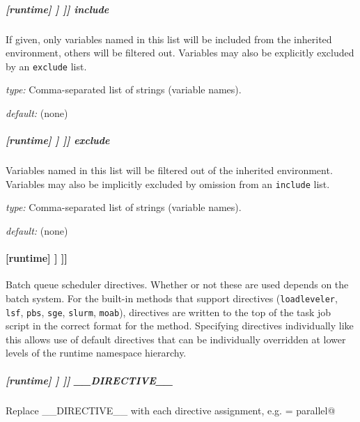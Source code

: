 \subparagraph[include]{[runtime] \textrightarrow [[\_\_NAME\_\_]] \textrightarrow [[[environment filter]]] \textrightarrow include}

If given, only variables named in this list will be included from the
inherited environment, others will be filtered out. Variables may also
be explicitly excluded by an \lstinline=exclude= list.

\begin{myitemize}
\item {\em type:} Comma-separated list of strings (variable names).
\item {\em default:} (none)
\end{myitemize}

\subparagraph[exclude]{[runtime] \textrightarrow [[\_\_NAME\_\_]] \textrightarrow [[[environment filter]]] \textrightarrow exclude}

Variables named in this list will be filtered out of the inherited
environment.  Variables may also be implicitly excluded by
omission from an \lstinline=include= list.

\begin{myitemize}
\item {\em type:} Comma-separated list of strings (variable names).
\item {\em default:} (none)
\end{myitemize}

\paragraph[{[[[}directives{]]]}]{[runtime] \textrightarrow [[\_\_NAME\_\_]] \textrightarrow [[[directives]]]}

Batch queue scheduler directives.  Whether or not these are used depends
on the batch system. For the built-in methods that support directives
(\lstinline=loadleveler=, \lstinline=lsf=, \lstinline=pbs=, \lstinline=sge=,
\lstinline=slurm=, \lstinline=moab=), directives are written to the top of the
task job script in the correct format for the method. Specifying directives
individually like this allows use of default directives that can be
individually overridden at lower levels of the runtime namespace hierarchy.

\subparagraph[\_\_DIRECTIVE\_\_ ]{[runtime] \textrightarrow [[\_\_NAME\_\_]] \textrightarrow [[[directives]]] \textrightarrow \_\_DIRECTIVE\_\_}

Replace \_\_DIRECTIVE\_\_ with each directive assignment, e.g.
\lstinline@class = parallel@

